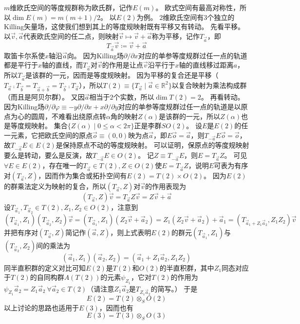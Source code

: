 $m$维欧氏空间的等度规群称为欧氏群，记作$E(m)$。
欧式空间有最高对称性，所以$\dim E(m) = m(m + 1) / 2$。
以$E(2)$为例。
$2$维欧氏空间有$3$个独立的Killing矢量场，这使我们想到其上的等度规映射既有平移又有转动。
先看平移。
以$\vec v, \vec a$代表欧氏空间的任二点，则映射$\vec v \mapsto \vec v + \vec a$称为平移，记作$T_{\vec a}$，即
$$T_{\vec a}\vec v \coloneq \vec v + \vec a$$
取笛卡尔系使$x$轴沿$\vec a$向。
因为Killing场$\partial / \partial x$对应的单参等度规群过任一点的轨道都是平行于$x$轴的直线，而$T_{\vec a}$对$\vec v$的作用是让点$\vec v$沿平行于$x$轴的直线移过距离$a$，所以$T_{\vec a}$是该群的一元，因而是等度规映射。
因为平移的复合还是平移（$T_{\vec a} \comp T_{\vec b} = T_{\vec a + \vec b} = T_{\vec b} \comp T_{\vec a}$），所以$T(2) \equiv \{T_{\vec a} \mid \vec a \in \mathbb{R}^2\}$以复合映射为乘法构成群（而且是阿贝尔群）。
又因$\vec a$相当于$2$个实数，所以$\dim T(2) = 2$。
再看转动。
因为Killing场$\partial / \partial \varphi \equiv -y\partial / \partial x + x\partial / \partial y$对应的单参等度规群过任一点的轨道是以原点为心的圆周，不难看出绕原点转$\alpha$角的映射$Z(\alpha)$是该群的一元，所以$Z(\alpha)$也是等度规映射。
集合$\{Z(\alpha) \mid 0 \leq \alpha < 2\pi\}$正是李群$SO(2)$。
设$E$是$E(2)$的任一元素，它把欧氏空间的原点$\vec o \equiv (0, 0)$映为点$\vec a$，即$E\vec o = \vec a$，则$T_{-\vec a}E\vec o = \vec o$，故$T_{-\vec a}E \in E(2)$是保持原点不动的等度规映射。
可以证明，保原点的等度规映射要么是转动，要么是反演，故$T_{-\vec a}E \in O(2)$。
记$Z \equiv T_{-\vec a}E$，则$E = T_{\vec a}Z$。
可见$\forall E \in E(2)$，存在唯一的$T_{\vec a} \in T(2), Z \in O(2)$使$E = T_{\vec a}Z$，说明$E$可表为有序对$(T_{\vec a}, Z)$，因而作为集合或拓扑空间有$E(2) = T(2) \times O(2)$。
因为$E(2)$的群乘法定义为映射的复合，所以$(T_{\vec a}, Z)$对$\vec v$的作用表现为
$$(T_{\vec a}, Z)\vec v = T_{\vec a}Z\vec v = Z\vec v + \vec a$$
设$T_{\vec a_1}, T_{\vec a_2} \in T(2), Z_1, Z_2 \in O(2)$，注意到
$$(T_{\vec a_1}, Z_1)(T_{\vec a_2}, Z_2)\vec v = (T_{\vec a_1}, Z_1)(Z_2\vec v + \vec a_2) = Z_1(Z_2\vec v + \vec a_2) + \vec a_1 = (T_{\vec a_1 + Z_1\vec a_2}, Z_1Z_2)\vec v$$
并把有序对$(T_{\vec a}, Z)$简记作$(\vec a, Z)$，则上式表明$E(2)$的群元$(T_{\vec a_1}, Z_1)$与$(T_{\vec a_2}, Z_2)$间的乘法为
$$(\vec a_1, Z_1)(\vec a_2, Z_2) = (\vec a_1 + Z_1\vec a_2, Z_1Z_2)$$
同半直积群的定义对比可知$E(2)$是$T(2)$和$O(2)$的半直积群，其中$Z_1$同态对应于$T(2)$的自同构群$A(T(2))$的元素$\psi_{Z_1}$，它对$T(2)$的作用为$\psi_{Z_1}\vec a_2 = Z_1\vec a_2 ~ \forall \vec a_2 \in T(2)$（请注意$Z_1\vec a_2$是$T_{Z_1\vec a_2}$的简写。）
于是
$$E(2) = T(2) \otimes_S O(2)$$
以上讨论的思路也适用于$E(3)$，因而也有
$$E(3) = T(3) \otimes_S O(3)$$

